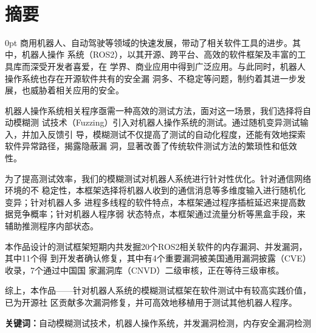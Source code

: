 \documentclass[zihao=-4]{ctexart}
\newcommand{\sanhao}{\fontsize{16pt}{0}}
\newcommand{\xiaosi}{\fontsize{12pt}{0}}
\newcommand{\setParDis}{\setlength {\parskip} {0pt} }
\begin{document}
\par \ 
\begin{center}
\sanhao
\centerline{\heiti{}}%
\end{center}



\renewcommand{\headrulewidth}{0pt}%
\clearpage
{} %

\xiaosi
\section*{摘要}
\begin{spacing}{1.5}
  \setParDis %
商用机器人、自动驾驶等领域的快速发展，带动了相关软件工具的进步。其中，机器人操作
系统（ROS2），以其开源、跨平台、高效的软件框架及丰富的工具库而深受开发者喜爱，在
学界、商业应用中得到广泛应用。与此同时，机器人操作系统也存在开源软件共有的安全漏
洞多、不稳定等问题，制约着其进一步发展，也威胁着相关应用的安全。

机器人操作系统相关程序亟需一种高效的测试方法，面对这一场景，我们选择将自动模糊测
试技术（Fuzzing）引入对机器人操作系统的测试。通过随机变异测试输入，并加入反馈引
导，模糊测试不仅提高了测试的自动化程度，还能有效地探索软件异常路径，揭露隐蔽漏
洞，显著改善了传统软件测试方法的繁琐性和低效性。

为了提高测试效率，我们的模糊测试对机器人系统进行针对性优化。针对通信网络环境的不
稳定性，本框架选择将机器人收到的通信消息等多维度输入进行随机化变异；针对机器人多
进程多线程的软件特点，本框架通过程序插桩延迟来提高数据竞争概率；针对机器人程序弱
状态特点，本框架通过流量分析等黑盒手段，来辅助推测程序内部状态。

本作品设计的测试框架短期内共发掘20个ROS2相关软件的内存漏洞、并发漏洞，其中11个得
到开发者确认修复，其中有4个重要漏洞被美国通用漏洞披露（CVE）收录，7个通过中国国
家漏洞库（CNVD）二级审核，正在等待三级审核。

综上，本作品——针对机器人系统的模糊测试框架在软件测试中有较高实践价值，已为开源社
区贡献多次漏洞修复，并可高效地移植用于测试其他机器人程序。


\end{spacing}
    
\textbf{关键词：}自动模糊测试技术，机器人操作系统，并发漏洞检测，内存安全漏洞检测

\newpage
\end{document}
